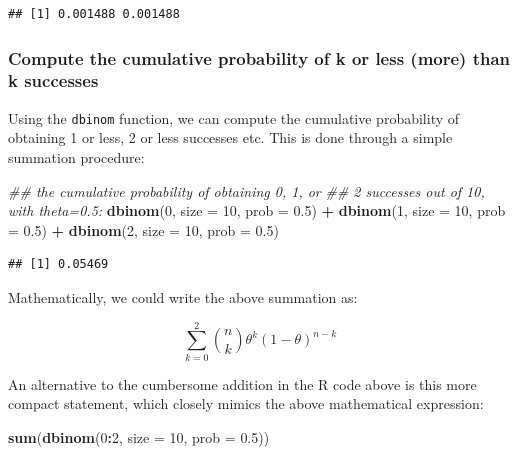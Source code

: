 \documentclass[12pt,]{krantz}
\newenvironment{Shaded}{\begin{snugshade}}{\end{snugshade}}
\newcommand{\CommentTok}[1]{\textcolor[rgb]{0.56,0.35,0.01}{\textit{#1}}}
\newcommand{\DataTypeTok}[1]{\textcolor[rgb]{0.13,0.29,0.53}{#1}}
\newcommand{\DecValTok}[1]{\textcolor[rgb]{0.00,0.00,0.81}{#1}}
\newcommand{\FloatTok}[1]{\textcolor[rgb]{0.00,0.00,0.81}{#1}}
\newcommand{\KeywordTok}[1]{\textcolor[rgb]{0.13,0.29,0.53}{\textbf{#1}}}
\newcommand{\NormalTok}[1]{#1}
\newcommand{\OperatorTok}[1]{\textcolor[rgb]{0.81,0.36,0.00}{\textbf{#1}}}
\newcommand{\StringTok}[1]{\textcolor[rgb]{0.31,0.60,0.02}{#1}}
\begin{document}
\begin{verbatim}
## [1] 0.001488 0.001488
\end{verbatim}

\hypertarget{compute-the-cumulative-probability-of-k-or-less-more-than-k-successes}{%
\subsubsection{Compute the cumulative probability of k or less (more) than k successes}\label{compute-the-cumulative-probability-of-k-or-less-more-than-k-successes}}

Using the \texttt{dbinom} function, we can compute the cumulative probability of obtaining 1 or less, 2 or less successes etc. This is done through a simple summation procedure:

\begin{Shaded}
\begin{Highlighting}[]
\CommentTok{## the cumulative probability of obtaining 0, 1, or}
\CommentTok{## 2 successes out of 10, with theta=0.5:}
\KeywordTok{dbinom}\NormalTok{(}\DecValTok{0}\NormalTok{, }\DataTypeTok{size =} \DecValTok{10}\NormalTok{, }\DataTypeTok{prob =} \FloatTok{0.5}\NormalTok{) }\OperatorTok{+}\StringTok{ }\KeywordTok{dbinom}\NormalTok{(}\DecValTok{1}\NormalTok{, }\DataTypeTok{size =} \DecValTok{10}\NormalTok{, }
  \DataTypeTok{prob =} \FloatTok{0.5}\NormalTok{) }\OperatorTok{+}\StringTok{ }\KeywordTok{dbinom}\NormalTok{(}\DecValTok{2}\NormalTok{, }\DataTypeTok{size =} \DecValTok{10}\NormalTok{, }\DataTypeTok{prob =} \FloatTok{0.5}\NormalTok{)}
\end{Highlighting}
\end{Shaded}

\begin{verbatim}
## [1] 0.05469
\end{verbatim}

Mathematically, we could write the above summation as:

\begin{equation}
\sum_{k=0}^2 \binom{n}{k} \theta^{k} (1-\theta)^{n-k} 
\end{equation}

An alternative to the cumbersome addition in the R code above is this more compact statement, which closely mimics the above mathematical expression:

\begin{Shaded}
\begin{Highlighting}[]
\KeywordTok{sum}\NormalTok{(}\KeywordTok{dbinom}\NormalTok{(}\DecValTok{0}\OperatorTok{:}\DecValTok{2}\NormalTok{, }\DataTypeTok{size =} \DecValTok{10}\NormalTok{, }\DataTypeTok{prob =} \FloatTok{0.5}\NormalTok{))}
\end{Highlighting}
\end{Shaded}
\end{document}
